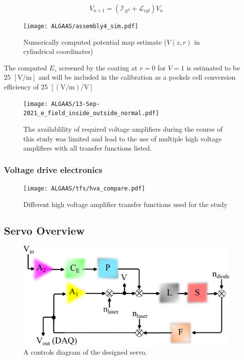 \begin{equation}
    V_{n + 1} = (\mathcal{I}_{N^2}  + \mathcal{L}_{cyl}) V_{n}
\end{equation}

\begin{figure}[H]
  \texttt{[image: ALGAAS/assembly4\_sim.pdf]}
  \caption{Numerically computed potential map estimate ($V(z,r)$ in cylindrical coordinates)}
  \label{fig:poissoncalcoutput}
\end{figure}

The computed $E_z$ screened by the coating at $r = 0$ for $V = 1$ is estimated to be 25 $[\mathrm{V}/\mathrm{m}]$ and will be included in the calibration as a pockels cell conversion efficiency of 25 $[(\mathrm{V} / \mathrm{m}) / \mathrm{V}]$  

\begin{figure}[H]
    \texttt{[image: ALGAAS/13-Sep-2021\_e\_field\_inside\_outside\_normal.pdf]}
    \caption{The availablility of required voltage amplifiers during the course of this study was limited and lead to the use of multiple high voltage amplifiers with all transfer functions listed.}
\label{fig:Ez}
\end{figure}


\subsubsection{Voltage drive electronics}

\begin{figure}[H]
    \texttt{[image: ALGAAS/tfs/hva\_compare.pdf]}
    \caption{Different high voltage amplifier transfer functions used for the study}
    \label{fig:hvacompare}
\end{figure}

\subsection{Servo Overview}
\begin{figure}[!ht]
	\includegraphics[width=\textwidth]{figs/ALGAAS/pock_control_diagram.pdf}
	\caption{A controls diagram of the designed servo.}
	\label{fig:pock_control_servo}
\end{figure}


